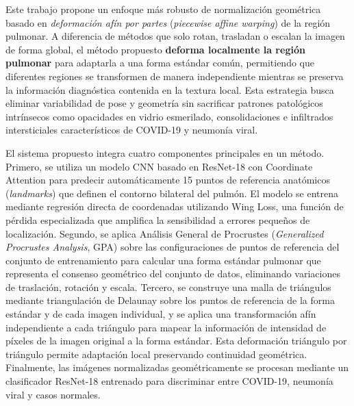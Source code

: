 Este trabajo propone un enfoque m\'as robusto de normalizaci\'on geom\'etrica basado en \textit{deformaci\'on af\'in por partes} (\textit{piecewise affine warping}) de la regi\'on pulmonar. A diferencia de m\'etodos que solo rotan, trasladan o escalan la imagen de forma global, el m\'etodo propuesto \textbf{deforma localmente la regi\'on pulmonar} para adaptarla a una forma est\'andar com\'un, permitiendo que diferentes regiones se transformen de manera independiente mientras se preserva la informaci\'on diagn\'ostica contenida en la textura local. Esta estrategia busca eliminar variabilidad de pose y geometr\'ia sin sacrificar patrones patol\'ogicos intr\'insecos como opacidades en vidrio esmerilado, consolidaciones e infiltrados intersticiales caracter\'isticos de COVID-19 y neumon\'ia viral.

El sistema propuesto integra cuatro componentes principales en un método. Primero, se utiliza un modelo CNN basado en ResNet-18 con Coordinate Attention para predecir autom\'aticamente 15 puntos de referencia anat\'omicos (\textit{landmarks}) que definen el contorno bilateral del pulm\'on. El modelo se entrena mediante regresi\'on directa de coordenadas utilizando Wing Loss, una funci\'on de p\'erdida especializada que amplifica la sensibilidad a errores peque\~nos de localizaci\'on. Segundo, se aplica An\'alisis General de Procrustes (\textit{Generalized Procrustes Analysis}, GPA) sobre las configuraciones de puntos de referencia del conjunto de entrenamiento para calcular una forma est\'andar pulmonar que representa el consenso geom\'etrico del conjunto de datos, eliminando variaciones de traslaci\'on, rotaci\'on y escala. Tercero, se construye una malla de tri\'angulos mediante triangulaci\'on de Delaunay sobre los puntos de referencia de la forma est\'andar y de cada imagen individual, y se aplica una transformaci\'on af\'in independiente a cada tri\'angulo para mapear la informaci\'on de intensidad de p\'ixeles de la imagen original a la forma est\'andar. Esta deformaci\'on tri\'angulo por tri\'angulo permite adaptaci\'on local preservando continuidad geom\'etrica. Finalmente, las im\'agenes normalizadas geom\'etricamente se procesan mediante un clasificador ResNet-18 entrenado para discriminar entre COVID-19, neumon\'ia viral y casos normales.


